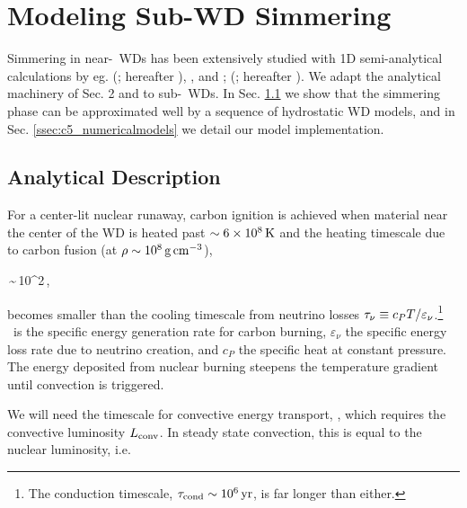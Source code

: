 \section{Modeling Sub-\Mch WD Simmering}
\label{sec:c5_modelsim}

Simmering in near-\Mch\ WDs has been extensively studied with 1D semi-analytical calculations by eg. \citeauthor{wooswk04} (\citeyear{wooswk04}; hereafter \citeal{wooswk04}), \cite{lesa+06, piro08}, and \citeauthor{piroc08}; (\citeyear{piroc08}; hereafter \citeal{piroc08}).  We adapt the analytical machinery of \citeal{wooswk04} {\charles Sec. 2} and \citeal{piroc08} to sub-\Mch\ WDs.  In Sec. \ref{ssec:c5_simmer} we show that the simmering phase can be approximated well by a sequence of hydrostatic WD models, and in Sec. \ref{ssec:c5_numericalmodels} we detail our model implementation.

\subsection{Analytical Description}
\label{ssec:c5_simmer}


For a center-lit nuclear runaway, carbon ignition is achieved when material near the center of the WD is heated past $\sim 6 \times10^8\,\mathrm{K}$ and the heating timescale due to carbon fusion (at $\rho \sim 10^8\,\gcc$),

\eqbegin
\taucc \equiv {}\,\sim\,10^2\,,
\label{eq:c5_taucc}
\eqend

\noindent becomes smaller than the cooling timescale from neutrino losses $\taunu\equiv c_P T/\varepsilon_\nu$.\footnote{The conduction timescale, $\taucond \sim 10^6\,\mrm{yr}$, is far longer than either.}  \epscc\ is the specific energy generation rate for carbon burning, $\varepsilon_\nu$ the specific energy loss rate due to neutrino creation, and $c_P$ the specific heat at constant pressure.  The energy deposited from nuclear burning steepens the temperature gradient until convection is triggered.


We will need the timescale for convective energy transport, \tauconv, which requires the convective luminosity $\Lconv$.  In steady state convection, this is equal to the nuclear luminosity, i.e.

